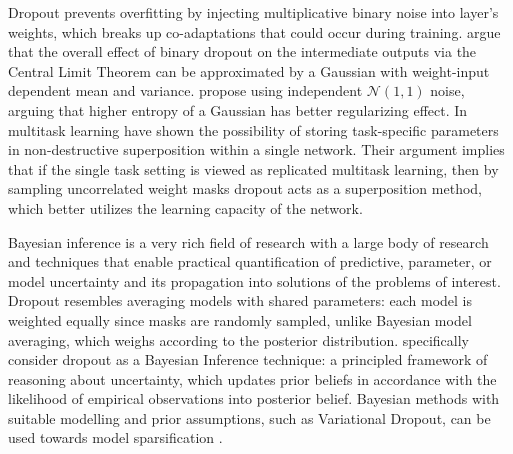 \documentclass[a4paper,10pt]{article}
\begin{document}
Dropout \citep{hinton_improving_2012} prevents overfitting by injecting multiplicative
binary noise into layer's weights, which breaks up co-adaptations that could occur
during training. \citet{wang_fast_2013} argue that the overall effect of binary dropout
on the intermediate outputs via the Central Limit Theorem can be approximated by a Gaussian
with weight-input dependent mean and variance. \citet{srivastava_dropout_2014} propose
using independent $\mathcal{N}(1,1)$ noise, arguing that higher entropy of a Gaussian has
better regularizing effect. In multitask learning \citet{cheung_superposition_2019}
have shown the possibility of storing task-specific parameters in non-destructive superposition
within a single network. Their argument implies that if the single task setting is viewed
as replicated multitask learning, then by sampling uncorrelated weight masks dropout acts
as a superposition method, which better utilizes the learning capacity of the network.

Bayesian inference is a very rich field of research with a large body of research and
techniques that enable practical quantification of predictive, parameter, or model
uncertainty and its propagation into solutions of the problems of interest.
%
Dropout resembles averaging models with shared parameters: each model is weighted equally
since masks are randomly sampled, unlike Bayesian model averaging, which weighs according to
the posterior distribution. \citet{kingma_variational_2015} specifically consider dropout
as a Bayesian Inference technique: a principled framework of reasoning about uncertainty,
which updates prior beliefs in accordance with the likelihood of empirical observations
into posterior belief. Bayesian methods with suitable modelling and prior assumptions, such
as Variational Dropout, can be used towards model sparsification
\citep{kingma_variational_2015,molchanov_variational_2017,kharitonov_variational_2018}.
\end{document}
